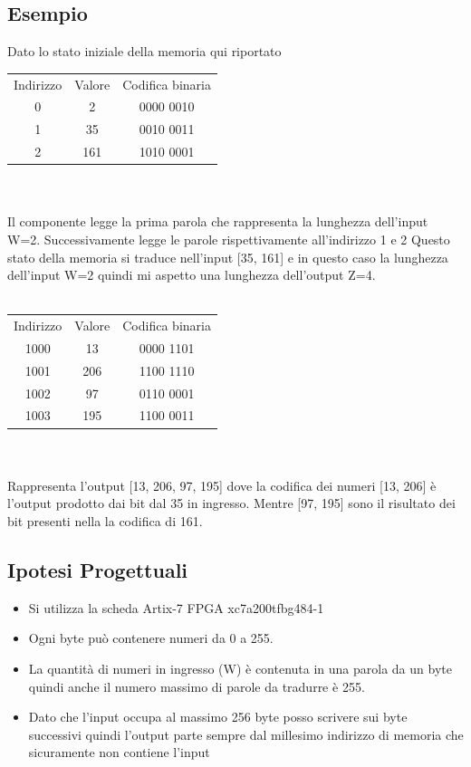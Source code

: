 \documentclass{article}
\begin{document}
\subsection{Esempio}
Dato lo stato iniziale della memoria qui riportato
\begin{tabular}{c c c}
	Indirizzo & Valore & Codifica binaria \\
	0 & 2 & 0000 0010 \\
	1 & 35 & 0010 0011 \\
	2 & 161 & 1010 0001 \\
\end{tabular}
\\
\\
Il componente legge la prima parola che rappresenta la lunghezza dell'input W=2. Successivamente legge le parole rispettivamente all'indirizzo 1 e 2
Questo stato della memoria si traduce nell'input [35, 161] e in questo caso la lunghezza dell'input W=2 quindi mi aspetto una lunghezza dell'output Z=4.
\\
\\
\begin{tabular}{c c c}
	Indirizzo & Valore & Codifica binaria \\
	1000 & 13 & 0000 1101 \\
	1001 & 206 & 1100 1110 \\
	1002 & 97 & 0110 0001 \\
	1003 & 195 & 1100 0011 \\
\end{tabular}
\\
\\
Rappresenta l'output [13, 206, 97, 195] dove la codifica dei numeri [13, 206] è l'output prodotto dai bit dal 35 in ingresso. Mentre [97, 195] sono il risultato dei bit presenti nella la codifica di 161.

\subsection{Ipotesi Progettuali}
\begin{itemize}
\item {Si utilizza la scheda Artix-7 FPGA xc7a200tfbg484-1}
\item {Ogni byte può contenere numeri da 0 a 255.}
\item {La quantità di numeri in ingresso (W) è contenuta in una parola da un byte quindi anche il numero massimo di parole da tradurre è 255.}
\item {Dato che l'input occupa al massimo 256 byte posso scrivere sui byte successivi quindi l'output parte sempre dal millesimo indirizzo di memoria che sicuramente non contiene l'input}
\end{itemize}
\end{document}
